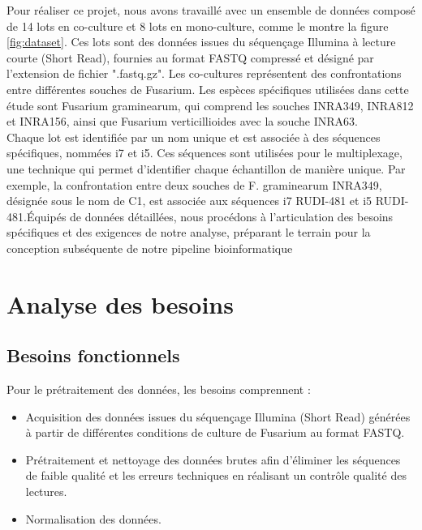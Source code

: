 Pour réaliser ce projet, nous avons travaillé avec un ensemble de données composé de 14 lots en co-culture et 8 lots en mono-culture, comme le montre la figure \ref{fig:dataset}. Ces lots sont des données issues du séquençage Illumina à lecture courte (Short Read), fournies au format FASTQ compressé et désigné par l'extension de fichier ".fastq.gz". Les co-cultures représentent des confrontations entre différentes souches de Fusarium. Les espèces spécifiques utilisées dans cette étude sont Fusarium graminearum, qui comprend les souches INRA349, INRA812 et INRA156, ainsi que Fusarium verticillioides avec la souche INRA63.\\

Chaque lot est identifiée par un nom unique et est associée à des séquences spécifiques, nommées i7 et i5. Ces séquences sont utilisées pour le multiplexage, une technique qui permet d’identifier chaque échantillon de manière unique. Par exemple, la confrontation entre deux souches de F. graminearum INRA349, désignée sous le nom de C1, est associée aux séquences i7 RUDI-481 et i5 RUDI-481.Équipés de données détaillées, nous procédons à l'articulation des besoins spécifiques et des exigences de notre analyse, préparant le terrain pour la conception subséquente de notre pipeline bioinformatique\\


\section{Analyse des besoins}

\subsection{Besoins fonctionnels}
Pour le prétraitement des données, les besoins comprennent :
\begin{itemize}
    \item Acquisition des données issues du séquençage Illumina (Short Read) générées à partir de différentes conditions de culture de Fusarium au format FASTQ.
    \item Prétraitement et nettoyage des données brutes afin d'éliminer les séquences de faible qualité et les erreurs techniques en réalisant un contrôle qualité des lectures.
    \item Normalisation des données.
\end{itemize}

